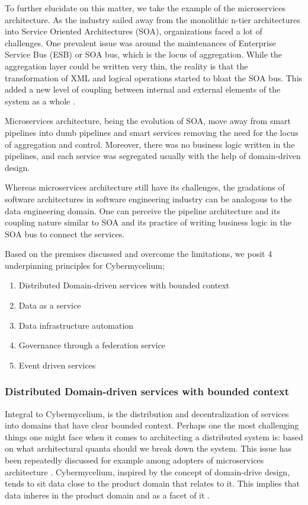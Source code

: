 \documentclass{bmcart}
\begin{document}
To further elucidate on this matter, we take the example of the microservices architecture. As the industry sailed away from the monolithic n-tier architectures into Service Oriented Architectures (SOA), organizations faced a lot of challenges. One prevalent issue was around the maintenances of Enterprise Service Bus (ESB) or SOA bus, which is the locus of aggregation. While the aggregation layer could be written very thin, the reality is that the transformation of XML and logical operations started to bloat the SOA bus. This added a new level of coupling between internal and external elements of the system as a whole \cite{di2017architecting,zimmermann2017microservices,waseem2020systematic}.

Microservices architecture, being the evolution of SOA, move away from smart pipelines into dumb pipelines and smart services removing the need for the locus of aggregation and control. Moreover, there was no business logic written in the pipelines, and each service was segregated usually with the help of domain-driven design.

Whereas microservices architecture still have its challenges, the gradations of software architectures in software engineering industry can be analogous to the data engineering domain. One can perceive the pipeline architecture and its coupling nature similar to SOA and its practice of writing business logic in the SOA bus to connect the services. 

Based on the premises discussed and overcome the limitations, we posit 4 underpinning principles for Cybermycelium;

\begin{enumerate}
    \item Distributed Domain-driven services with bounded context
    \item Data as a service
    \item Data infrastructure automation
    \item Governance through a federation service
    \item Event driven services

\end{enumerate}

\subsubsection{Distributed Domain-driven services with bounded context}

Integral to Cybermycelium, is the distribution and decentralization of services into domains that have clear bounded context. Perhaps one the most challenging things one might face when it comes to architecting a distributed system is: based on what architectural quanta should we break down the system. This issue has been repeatedly discussed for example among adopters of microservices architecture . Cybermycelium, inspired by the concept of domain-drive design, tends to sit data close to the product domain that relates to it. This implies that data inheres in the product domain and as a facet of it \cite{laigner2021data}.
\end{document}
